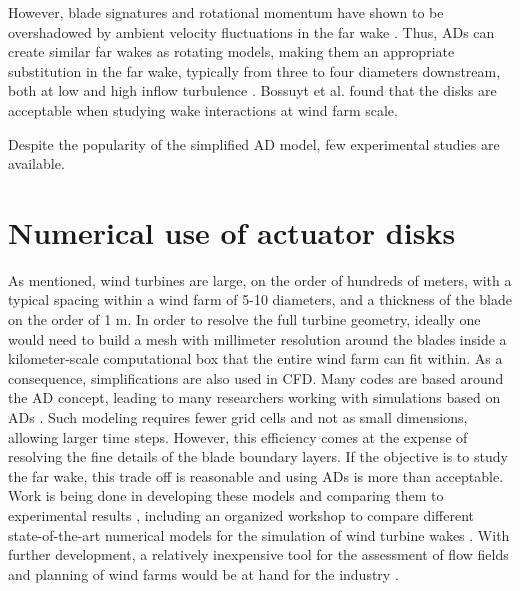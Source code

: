 However, blade signatures and rotational momentum have shown to be overshadowed by ambient velocity fluctuations in the far wake \cite{Aubrun2013}. Thus, \gls{AD}s can create similar far wakes as rotating models, making them an appropriate substitution in the far wake, typically from three to four diameters downstream, both at low and high inflow turbulence \cite{Neunaber, Aubrun2019, Lignarolo2016, Lignarolo2014, Aubrun2013}. Bossuyt et al. \cite{Bossuyt2016} found that the disks are acceptable when studying wake interactions at wind farm scale.  

Despite the popularity of the simplified \gls{AD} model, few experimental studies are available. 







\section{Numerical use of actuator disks}

As mentioned, wind turbines are large, on the order of hundreds of meters, with a typical spacing within a wind farm of 5-10 diameters, and a thickness of the blade on the order of 1 \si{m}. In order to resolve the full turbine geometry, ideally one would need to build a mesh with millimeter resolution around the blades inside a kilometer-scale computational box that the entire wind farm can fit within. As a consequence, simplifications are also used in \gls{CFD}. Many codes are based around the \gls{AD} concept, leading to many researchers working with simulations based on \gls{AD}s \cite{Tossas2014, Harrison2010, Lignarolo2016, Wu2011, Wu2012, Simisiroglou2017, Stevens2014, StevensAlso2014}. Such modeling requires fewer grid cells and not as small dimensions, allowing larger time steps. However, this efficiency comes at the expense of resolving the fine details of the blade boundary layers. If the objective is to study the far wake, this trade off is reasonable and using \gls{AD}s is more than acceptable. Work is being done in developing these models and comparing them to experimental results \cite{Tossas2014, Harrison2010}, including an organized workshop to compare different state-of-the-art numerical models for the simulation of wind turbine wakes \cite{LignaroloWorkshop2016}. With further development, a relatively inexpensive tool for the assessment of flow fields and planning of wind farms would be at hand for the industry  \cite{Sforza1981, Harrison2010}. 

